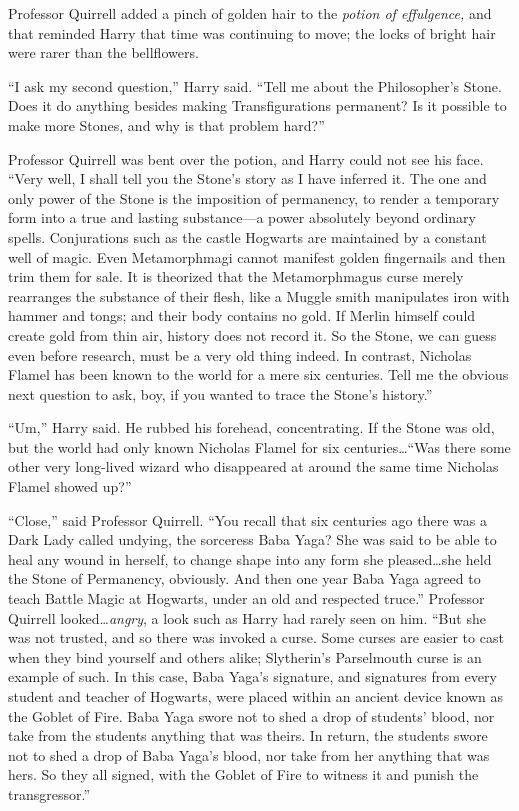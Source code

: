 Professor Quirrell added a pinch of golden hair to the \emph{potion of effulgence,} and that reminded Harry that time was continuing to move; the locks of bright hair were rarer than the bellflowers.

“I ask my second question,” Harry said. “Tell me about the Philosopher’s Stone. Does it do anything besides making Transfigurations permanent? Is it possible to make more Stones, and why is that problem hard?”

Professor Quirrell was bent over the potion, and Harry could not see his face. “Very well, I shall tell you the Stone’s story as I have inferred it. The one and only power of the Stone is the imposition of permanency, to render a temporary form into a true and lasting substance—a power absolutely beyond ordinary spells. Conjurations such as the castle Hogwarts are maintained by a constant well of magic. Even Metamorphmagi cannot manifest golden fingernails and then trim them for sale. It is theorized that the Metamorphmagus curse merely rearranges the substance of their flesh, like a Muggle smith manipulates iron with hammer and tongs; and their body contains no gold. If Merlin himself could create gold from thin air, history does not record it. So the Stone, we can guess even before research, must be a very old thing indeed. In contrast, Nicholas Flamel has been known to the world for a mere six centuries. Tell me the obvious next question to ask, boy, if you wanted to trace the Stone’s history.”

“Um,” Harry said. He rubbed his forehead, concentrating. If the Stone was old, but the world had only known Nicholas Flamel for six centuries…“Was there some other very long-lived wizard who disappeared at around the same time Nicholas Flamel showed up?”

“Close,” said Professor Quirrell. “You recall that six centuries ago there was a Dark Lady called undying, the sorceress Baba Yaga? She was said to be able to heal any wound in herself, to change shape into any form she pleased…she held the Stone of Permanency, obviously. And then one year Baba Yaga agreed to teach Battle Magic at Hogwarts, under an old and respected truce.” Professor Quirrell looked…\emph{angry}, a look such as Harry had rarely seen on him. “But she was not trusted, and so there was invoked a curse. Some curses are easier to cast when they bind yourself and others alike; Slytherin’s Parselmouth curse is an example of such. In this case, Baba Yaga’s signature, and signatures from every student and teacher of Hogwarts, were placed within an ancient device known as the Goblet of Fire. Baba Yaga swore not to shed a drop of students’ blood, nor take from the students anything that was theirs. In return, the students swore not to shed a drop of Baba Yaga’s blood, nor take from her anything that was hers. So they all signed, with the Goblet of Fire to witness it and punish the transgressor.”

